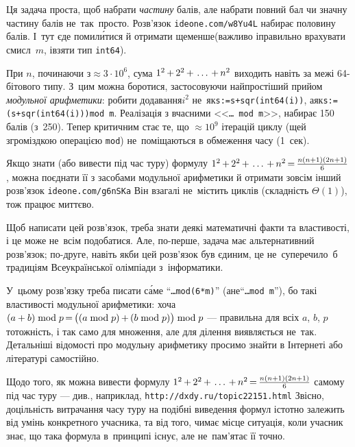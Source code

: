 \Tutorial
Ця задача проста, щоб набрати \emph{частину} балів, але набрати повний бал чи значну частину балів не~так~просто. Розв'язок \verb"ideone.com/w8Yu4L" набирає половину балів. 
І~тут є\nolinebreak[2] де помил\'{и}тися й отримати ще\nolinebreak[3] менше\nolinebreak[3] (важливо і\nolinebreak[3] правильно врахувати смисл~$m$, і\nolinebreak[3] взяти тип \texttt{int64}).

При $n$, починаючи з${}\approx3{\cdot}10^6$, сума $1^2\dib{{+}}2^2\dib{{+}}\dots\dib{{+}}n^2$ виходить навіть за межі 64-\nolinebreak[1]бітового типу. З~цим можна боротися, застосовуючи найпростіший прийом \emph{модульної арифметики}: робити додавання\nolinebreak[3] $i^2$ не~як\nolinebreak[3] \verb"s:=s+sqr(int64(i))", а\nolinebreak[2] як\nolinebreak[3] \verb"s:=(s+sqr(int64(i)))mod m". 
Реалізація з вчасними <<\texttt{\dots~mod~m}>>, набирає 150 балів (з~250). 
Тепер критичним стає те, що $\approx{}10^9$ ітерацій циклу (ще\nolinebreak[3] й з\nolinebreak[2] громіздкою операцією \texttt{mod}) не~поміщаються в обмеження часу (1~сек).

Якщо знати (або вивести під час туру) формулу $1^2\dib{{+}}2^2\dib{{+}}\dots\dib{{+}}n^2\dib{{=}}\frac{n(n+1)(2n+1)}{6}$, можна поєднати її з засобами модульної арифметики й отримати зовсім інший розв'язок \verb"ideone.com/g6nSKa"\hspace{0.5em plus 1em} Він взагалі не~містить циклів (складність $\Theta(1)$), тож працює миттєво.

Щоб написати цей розв'язок, треба знати деякі математичні факти та властивості, і це може не~всім подобатися. Але, по-перше, задача має альтернативний розв'язок; по-друге, навіть якби цей розв'язок був єдиним, це не~суперечило~б традиціям Всеукраїнської олімпіади з~інформатики.

У~цьому розв'язку треба писати с\'{а}ме ``\texttt{\dots\nolinebreak[3] mod\nolinebreak[3] \mbox{(6*m)}}'' (а\nolinebreak[2] не\nolinebreak[3] ``\texttt{\dots\nolinebreak[3] mod~m}''), бо такі властивості модульної арифметики: хоча ${(a+b)\bmod p} \dib{{=}} {\bigl((a\bmod p)}\dib{{+}}{(b\bmod p)\bigr)\bmod p}$ --- правильна для всіх $a$, $b$, $p$ тотожність, і так само для множення, але для ділення виявляється не~так. Детальніші відомості про модульну арифметику просимо знайти в Інтернеті або літературі самостійно.

Щодо того, як можна вивести формулу $1^2\dib{{+}}2^2\dib{{+}}\dots\dib{{+}}n^2\dib{{=}}\frac{n(n+1)(2n+1)}{6}$ самому під час туру --- див., наприклад, \verb"http://dxdy.ru/topic22151.html"\hspace{0.5em plus 1em} Звісно, доцільність витрачання часу туру на подібні виведення формул істотно залежить від умінь конкретного учасника, та від того, чи\nolinebreak[3] має місце ситуація, коли учасник знає, що така формула в~принципі існує, але не~пам'ятає її точно.


